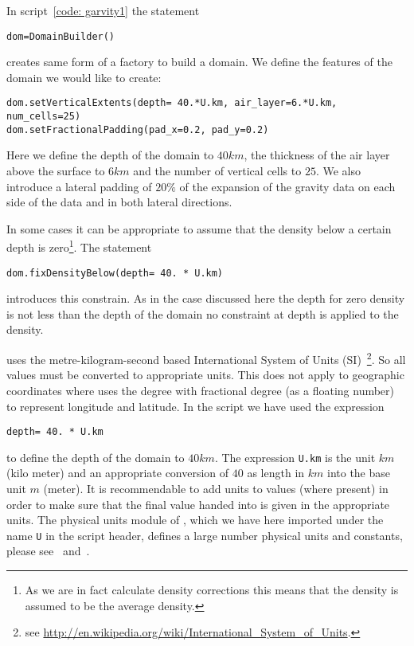 In script~\ref{code: garvity1} the statement
\begin{verbatim}
dom=DomainBuilder()
\end{verbatim}
creates same form of a factory to build a domain. 
We define the features of the domain we would like to create:
\begin{verbatim}
dom.setVerticalExtents(depth= 40.*U.km, air_layer=6.*U.km, num_cells=25)
dom.setFractionalPadding(pad_x=0.2, pad_y=0.2)
\end{verbatim}
Here we define the depth of the domain to $40 km$, the thickness of the air layer above the surface to $6km$ and 
the number of vertical cells to $25$. We also introduce a lateral padding of $20 \%$ of the expansion of
the gravity data on each side of the data and in both lateral directions.

In some cases it can be appropriate to assume that the density below a certain depth is 
zero\footnote{As we are in fact calculate density corrections this means that the density is assumed to be
the average density.}. The statement 
\begin{verbatim}
dom.fixDensityBelow(depth= 40. * U.km)
\end{verbatim}
introduces this constrain. As in the case discussed here the depth for zero density is not less than the
depth of the domain no constraint at depth is applied to the density.

\downunder uses the  metre-kilogram-second based 
International System of Units (SI)~\footnote{see \url{http://en.wikipedia.org/wiki/International_System_of_Units}.}. So all 
values must be converted to appropriate units. This does not apply to geographic coordinates where \downunder uses
the degree with fractional degree (as a floating number) to represent longitude and latitude. In the script we have used the expression
\begin{verbatim}
depth= 40. * U.km
\end{verbatim}
to define the depth of the domain to $40 km$. The expression \verb|U.km| is the unit $km$ (kilo meter) and an appropriate conversion 
of $40$ as length in $km$  into the base unit $m$ (meter). It is recommendable to add units to values (where present) 
in order to make sure that the final value handed into \downunder is given in the appropriate units. The physical units
module of \escript, which we have here imported under the name \verb|U| in the script header, defines a large number 
physical units and constants, please see~\cite{ESCRIPT} and~\cite{ESCRIPTONLINE}. 


